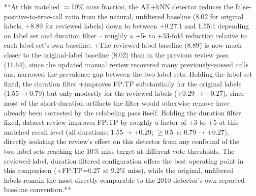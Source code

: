 \documentclass[preprint,NumberedRefs]{JASAnew}
\begin{document}
**At this matched $\approx$10\% miss fraction, the AE+kNN detector reduces the
false-positive-to-true-call ratio from the natural, unfiltered baseline (8.02
for original labels, {+}8.89 for reviewed labels) down to between {+}0.27:1
and 1.55:1 depending on label set and duration filter -- roughly a {+}5- to
{+}33-fold reduction relative to each label set's own baseline. {+}The
reviewed-label baseline (8.89) is now much closer to the original-label
baseline (8.02) than in the previous review pass (11.64), since the updated
manual review recovered many previously-missed calls and narrowed the
prevalence gap between the two label sets. Holding the label set
fixed, the duration filter {+}improves FP:TP substantially for the original
labels (1.55$\to$0.79) but only modestly for the reviewed labels
({+}0.29$\to${+}0.27), since most of the short-duration artifacts the filter
would otherwise remove have already been corrected by the relabeling pass
itself. Holding the duration
filter fixed, dataset review improves FP:TP by roughly a factor of {+}3 to
{+}5 at this matched recall level (all durations: 1.55$\to${+}0.29; $\geq$0.5~s:
0.79$\to${+}0.27), directly isolating the review's effect on this detector from
any confound of the two label sets reaching the 10\% miss target at different
vote thresholds. The reviewed-label, duration-filtered
configuration offers the best operating point in this comparison
({+}FP:TP=0.27 at 9.2\% miss), while the original, unfiltered labels remain the
most directly comparable to the 2010 detector's own reported baseline
convention.**

\end{document}
